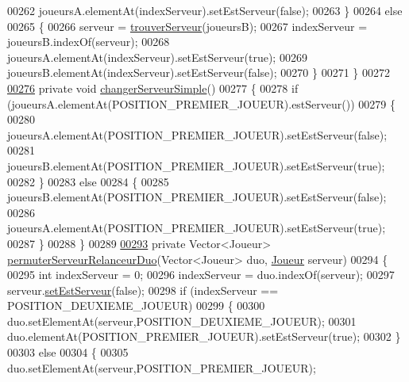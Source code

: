 \begin{DoxyCode}
00262             joueursA.elementAt(indexServeur).setEstServeur(\textcolor{keyword}{false});
00263         \}
00264         \textcolor{keywordflow}{else}
00265         \{
00266             serveur = \hyperlink{classcom_1_1example_1_1area_1_1_partie_a34c737de89dee9e2510fa5959e238a3e}{trouverServeur}(joueursB);
00267             indexServeur = joueursB.indexOf(serveur);
00268             joueursA.elementAt(indexServeur).setEstServeur(\textcolor{keyword}{true});
00269             joueursB.elementAt(indexServeur).setEstServeur(\textcolor{keyword}{false});
00270         \}
00271     \}
00272 
\hyperlink{classcom_1_1example_1_1area_1_1_partie_ad6d7eef6348a783f9cdd0eb3dd14793d}{00276}     \textcolor{keyword}{private} \textcolor{keywordtype}{void} \hyperlink{classcom_1_1example_1_1area_1_1_partie_ad6d7eef6348a783f9cdd0eb3dd14793d}{changerServeurSimple}()
00277     \{
00278         \textcolor{keywordflow}{if} (joueursA.elementAt(POSITION\_PREMIER\_JOUEUR).estServeur())
00279         \{
00280             joueursA.elementAt(POSITION\_PREMIER\_JOUEUR).setEstServeur(\textcolor{keyword}{false});
00281             joueursB.elementAt(POSITION\_PREMIER\_JOUEUR).setEstServeur(\textcolor{keyword}{true});
00282         \}
00283         \textcolor{keywordflow}{else}
00284         \{
00285             joueursB.elementAt(POSITION\_PREMIER\_JOUEUR).setEstServeur(\textcolor{keyword}{false});
00286             joueursA.elementAt(POSITION\_PREMIER\_JOUEUR).setEstServeur(\textcolor{keyword}{true});
00287         \}
00288     \}
00289 
\hyperlink{classcom_1_1example_1_1area_1_1_partie_a3143072ab9e3a306a42a84ecac4bdcf1}{00293}     \textcolor{keyword}{private} Vector<Joueur> \hyperlink{classcom_1_1example_1_1area_1_1_partie_a3143072ab9e3a306a42a84ecac4bdcf1}{permuterServeurRelanceurDuo}(Vector<Joueur> duo, 
      \hyperlink{classcom_1_1example_1_1area_1_1_joueur}{Joueur} serveur)
00294     \{
00295         \textcolor{keywordtype}{int} indexServeur = 0;
00296         indexServeur = duo.indexOf(serveur);
00297         serveur.\hyperlink{classcom_1_1example_1_1area_1_1_joueur_aa0ae3b52616cc034cd6270eade9a1be7}{setEstServeur}(\textcolor{keyword}{false});
00298         \textcolor{keywordflow}{if} (indexServeur == POSITION\_DEUXIEME\_JOUEUR)
00299         \{
00300             duo.setElementAt(serveur,POSITION\_DEUXIEME\_JOUEUR);
00301             duo.elementAt(POSITION\_PREMIER\_JOUEUR).setEstServeur(\textcolor{keyword}{true});
00302         \}
00303         \textcolor{keywordflow}{else}
00304         \{
00305             duo.setElementAt(serveur,POSITION\_PREMIER\_JOUEUR);

\end{DoxyCode}
